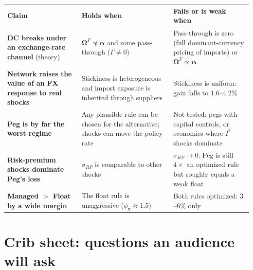 \documentclass[11pt]{article}
\newcommand{\claim}[1]{\textbf{#1}}
\begin{document}
\begin{table}[H]
\centering\small
\begin{tabular}{p{4.2cm}p{4.2cm}p{4.6cm}}
\toprule
Claim & Holds when & Fails or is weak when \\
\midrule
\claim{DC breaks under an exchange-rate channel} (theory) & $\bm\Omega^F\not\propto\bm\alpha$ and some pass-through ($\Gamma\neq0$) & Pass-through is zero (full dominant-currency pricing of imports) or $\bm\Omega^F\propto\bm\alpha$ \\[3pt]
\claim{Network raises the value of an FX response to real shocks} & Stickiness is heterogeneous and import exposure is inherited through suppliers & Stickiness is uniform: gain falls to $1.6$--$4.2$\% \\[3pt]
\claim{Peg is by far the worst regime} & Any plausible rule can be chosen for the alternative; shocks can move the policy rate & Not tested: pegs with capital controls, or economies where $I^*$ shocks dominate \\[3pt]
\claim{Risk-premium shocks dominate Peg's loss} & $\sigma_{RP}$ is comparable to other shocks & $\sigma_{RP}\to0$: Peg is still $4\times$ an optimized rule but roughly equals a weak float \\[3pt]
\claim{Managed $>$ Float by a wide margin} & The float rule is unaggressive ($\phi_\pi\approx1.5$) & Both rules optimized: $3$--$6$\% only \\
\bottomrule
\end{tabular}
\end{table}

\section{Crib sheet: questions an audience will ask}
\end{document}

